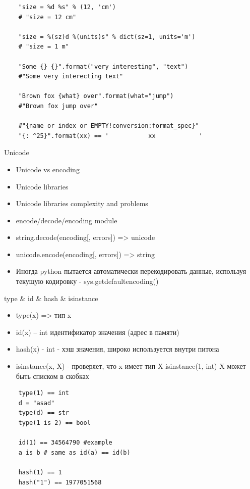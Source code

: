 \documentclass{article}
\begin{document}
\vspace{15pt}
\begin{lstlisting}
	"size = %d %s" % (12, 'cm') 
	# "size = 12 cm"

	"size = %(sz)d %(units)s" % dict(sz=1, units='m') 
	# "size = 1 m"

	"Some {} {}".format("very interesting", "text")
	#"Some very interecting text"

	"Brown fox {what} over".format(what="jump")
	#"Brown fox jump over"

	#"{name or index or EMPTY!conversion:format_spec}"
	"{: ^25}".format(xx) == '           xx            '
\end{lstlisting}
\newpage

\begin{center} Unicode \end{center}
\begin{itemize}
	\item Unicode vs encoding
	\item Unicode libraries
	\item Unicode libraries complexity and problems
	\item encode/decode/encoding module
	\item string.decode(encoding[, errors]) => unicode
	\item unicode.encode(encoding[, errors]) => string
	\item Иногда python пытается автоматически перекодировать 
			данные, используя текущую кодировку - sys.getdefaultencoding()
\end{itemize}
\newpage

\begin{center} type \& id \& hash \& isinstance \end{center}
\begin{itemize}
	\item type(x) => тип x
	\item id(x) – int идентификатор значения (адрес в памяти)
	\item hash(x) - int - хэш значения, широко используется внутри питона
	\item isinstance(x, X) - проверяет, что x имеет тип X isinstance(1, int)
		X может быть списком в скобках
\end{itemize}

\vspace{15pt}
\begin{lstlisting}
	type(1) == int
	d = "asad"
	type(d) == str
	type(1 is 2) == bool

	id(1) == 34564790 #example
	a is b # same as id(a) == id(b)

	hash(1) == 1
	hash("1") == 1977051568
\end{lstlisting}
\end{document}
